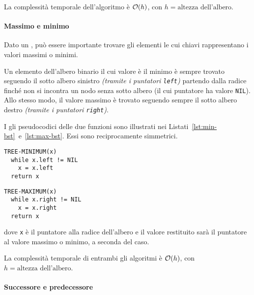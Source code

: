 \documentclass[italian, 10pt]{article}
\begin{document}
\bigskip
La complessità temporale dell'algoritmo è \(\mathcal{O}(h)\), con \(h = \text{altezza dell'albero}\).

\paragraph{Massimo e minimo}
\label{par:massimo-minimo-bst}

Dato un \BST, può essere importante trovare gli elementi le cui chiavi rappresentano i valori massimi o minimi.

Un elemento dell'albero binario il cui valore è il minimo è sempre trovato seguendo il sotto albero sinistro \textit{(tramite i puntatori \texttt{left})} partendo dalla radice finché non si incontra un nodo senza sotto albero (il cui puntatore ha valore \texttt{NIL}).
Allo stesso modo, il valore massimo è trovato seguendo sempre il sotto albero destro \textit{(tramite i puntatori \texttt{right})}.

I gli pseudocodici delle due funzioni sono illustrati nei Listati~\ref{lst:min-bst}~e~\ref{lst:max-bst}.
Essi sono reciprocamente simmetrici.

\begin{minipage}[t]{0.495\textwidth}
  \begin{lstlisting}[style=pseudocode, caption={Minimo di un BST}, label={lst:min-bst}]
TREE-MINIMUM(x)
  while x.left != NIL
    x = x.left
  return x
  \end{lstlisting}
\end{minipage}
\begin{minipage}[t]{0.495\textwidth}
  \begin{lstlisting}[style=pseudocode, caption={Massimo di un BST}, label={lst:max-bst}]
TREE-MAXIMUM(x)
  while x.right != NIL
    x = x.right
  return x
  \end{lstlisting}
\end{minipage}

dove \texttt{x} è il puntatore alla radice dell'albero e il valore restituito sarà il puntatore al valore massimo o minimo, a seconda del caso.

\bigskip
La complessità temporale di entrambi gli algoritmi è \(\mathcal{O}(h)\), con \(h = \text{altezza dell'albero}\).

\paragraph{Successore e predecessore}
\label{par:successore-predecessore-bst}
\end{document}

